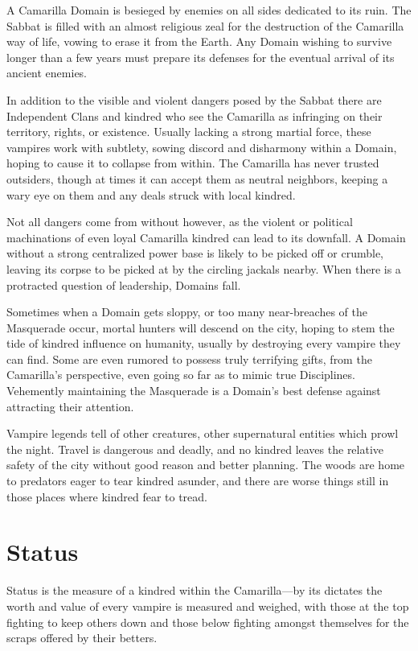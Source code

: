 A Camarilla Domain is besieged by enemies on all sides dedicated to its ruin.  The Sabbat is 
filled with an almost religious zeal for the destruction of the Camarilla way of life, vowing 
to erase it from the Earth.  Any Domain wishing to survive longer than a few years must 
prepare its defenses for the eventual arrival of its ancient enemies.

In addition to the visible and violent dangers posed by the Sabbat there are Independent Clans 
and kindred who see the Camarilla as infringing on their territory, rights, or existence.  
Usually lacking a strong martial force, these vampires work with subtlety, sowing discord and 
disharmony within a Domain, hoping to cause it to collapse from within.  The Camarilla has never 
trusted outsiders, though at times it can accept them as neutral neighbors, keeping a wary eye 
on them and any deals struck with local kindred.

Not all dangers come from without however, as the violent or political machinations of even 
loyal Camarilla kindred can lead to its downfall.  A Domain without a strong centralized power 
base is likely to be picked off or crumble, leaving its corpse to be picked at by the circling 
jackals nearby.  When there is a protracted question of leadership, Domains fall.

Sometimes when a Domain gets sloppy, or too many near-breaches of the Masquerade occur, mortal 
hunters will descend on the city, hoping to stem the tide of kindred influence on humanity, 
usually by destroying every vampire they can find.  Some are even rumored to possess truly 
terrifying gifts, from the Camarilla's perspective, even going so far as to mimic true Disciplines.  
Vehemently maintaining the Masquerade is a Domain's best defense against attracting their attention.

Vampire legends tell of other creatures, other supernatural entities which prowl the night.  
Travel is dangerous and deadly, and no kindred leaves the relative safety of the city without 
good reason and better planning.  The woods are home to predators eager to tear kindred asunder, 
and there are worse things still in those places where kindred fear to tread.

%
%

\section{Status}
\label{sec:status}
Status is the measure of a kindred within the Camarilla---by its dictates the 
worth and value of every vampire is measured and weighed, with those at the top 
fighting to keep others down and those below fighting amongst themselves for the 
scraps offered by their betters.


